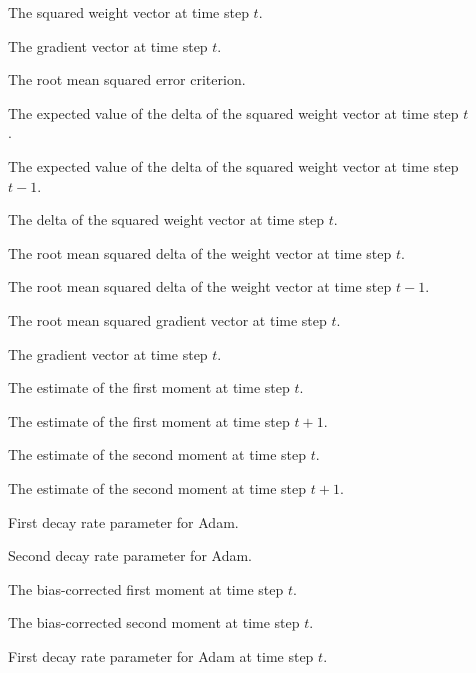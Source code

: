 \begin{description}
	\item [\parbox{2cm}{$\boldsymbol{w}_{t}^{2}$}] The squared weight vector at time step $t$.
	\item [\parbox{2cm}{$\boldsymbol{g}_{t}$}] The gradient vector at time step $t$.
	\item [\parbox{2cm}{$RMS$}] The root mean squared error criterion.
	\item [\parbox{2cm}{$E[\Delta \boldsymbol{w}^{2}]_{t}$}] The expected value of the delta of the squared weight vector at time step $t$.
	\item [\parbox{2cm}{$E[\Delta \boldsymbol{w}^{2}]_{t - 1}$}] The expected value of the delta of the squared weight vector at time step $t-1$.
	\item [\parbox{2cm}{$\Delta \boldsymbol{w}^{2}_{t}$}] The delta of the squared weight vector at time step $t$.
	\item [\parbox{2cm}{$RMS[\Delta \boldsymbol{w}]_{t}$}] The root mean squared delta of the weight vector at time step $t$.
	\item [\parbox{2cm}{$RMS[\Delta \boldsymbol{w}]_{t-1}$}] The root mean squared delta of the weight vector at time step $t-1$.
	\item [\parbox{2cm}{$RMS[\boldsymbol{g}]_{t}$}] The root mean squared gradient vector at time step $t$.
	\item [\parbox{2cm}{$\boldsymbol{g}_{t}$}] The gradient vector at time step $t$.
	\item [\parbox{2cm}{$\boldsymbol{m}_{t}$}] The estimate of the first moment at time step $t$.
	\item [\parbox{2cm}{$\boldsymbol{m}_{t+1}$}] The estimate of the first moment at time step $t+1$.
	\item [\parbox{2cm}{$\boldsymbol{v}_{t}$}] The estimate of the second moment at time step $t$.
	\item [\parbox{2cm}{$\boldsymbol{v}_{t+1}$}] The estimate of the second moment at time step $t+1$.
	\item [\parbox{2cm}{$\beta_{1}$}] First decay rate parameter for \acs{Adam}.
	\item [\parbox{2cm}{$\beta_{2}$}] Second decay rate parameter for \acs{Adam}.
	\item [\parbox{2cm}{$\hat{\boldsymbol{m}}_{t}$}] The bias-corrected first moment at time step $t$.
	\item [\parbox{2cm}{$\hat{\boldsymbol{v}}_{t}$}] The bias-corrected second moment at time step $t$.
	\item [\parbox{2cm}{$\beta^{t}_{1}$}] First decay rate parameter for \acs{Adam} at time step $t$.

\end{description}
